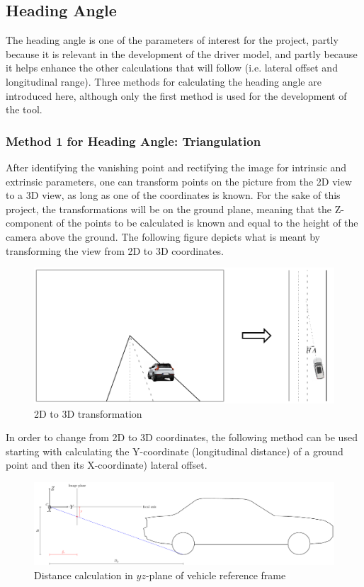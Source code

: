 \subsection{Heading Angle}
The heading angle is one of the parameters of interest for the project, partly because it is relevant in the development of the driver model, and partly because it helps enhance the other calculations that will follow (i.e. lateral offset and longitudinal range). Three methods for calculating the heading angle are introduced here, although only the first method is used for the development of the tool.

\subsubsection{Method 1 for Heading Angle: Triangulation}
After identifying the vanishing point and rectifying the image for intrinsic and extrinsic parameters, one can transform points on the picture from the 2D view to a 3D view, as long as one of the coordinates is known. For the sake of this project, the transformations will be on the ground plane, meaning that the Z-component of the points to be calculated is known and equal to the height of the camera above the ground. The following figure depicts what is meant by transforming the view from 2D to 3D coordinates.

\begin{figure}[H]
    \centering
    \includegraphics[width=\textwidth]{Figures/2d2d3.pdf}
    \caption{2D to 3D transformation}
    \label{fig:2d23d}
\end{figure}


In order to change from 2D to 3D coordinates, the following method can be used starting with calculating the Y-coordinate (longitudinal distance) of a ground point and then its X-coordinate) lateral offset.

\begin{figure}[H]
    \centering
    \includegraphics[width=\textwidth]{Figures/D_y.pdf}
    \caption{Distance calculation in $yz$-plane of vehicle reference frame}
\end{figure}

